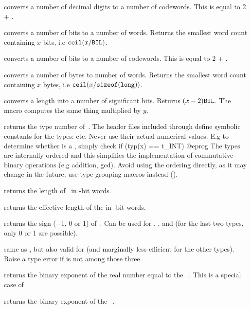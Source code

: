  converts a number of decimal digits to a number
of codewords. This is equal to 2 + .

 converts a number of bits to a number of
words. Returns the smallest word count containing $x$ bits, i.e $
{\tt ceil}(x / {\tt BIL})$.

 converts a number of bits to a number of
codewords. This is equal to 2 + .

 converts a number of bytes to number of
words. Returns the smallest word count containing $x$ bytes, i.e
${\tt ceil}(x / {\tt sizeof(long)})$.

 converts a  length into a number
of significant bits. Returns $(x - 2){\tt BIL}$. The macro 
computes the same thing multiplied by $y$.


 returns the type number of~. The header files
included through  define symbolic constants for the 
types:  etc. Never use their actual numerical values. E.g to determine
whether  is a , simply check
\bprog
  if (typ(x) == t_INT) { }
@eprog\noindent
The types are internally ordered and this simplifies the implementation of
commutative binary operations (e.g addition, gcd). Avoid using the ordering
directly, as it may change in the future; use type grouping macros
instead ().

 returns the length of~ in \B-bit words.

 returns the effective length of the  
in \B-bit words.

 returns the sign ($-1$, 0 or 1) of~. Can be
used for , ,  and  (for the last two
types, only 0 or 1 are possible).

 same as , but also valid for 
(and marginally less efficient for the other types). Raise a type error if
 is not among those three.

 returns the binary exponent of the real number equal
to the ~. This is a special case of .

 returns the binary exponent of the
~.

